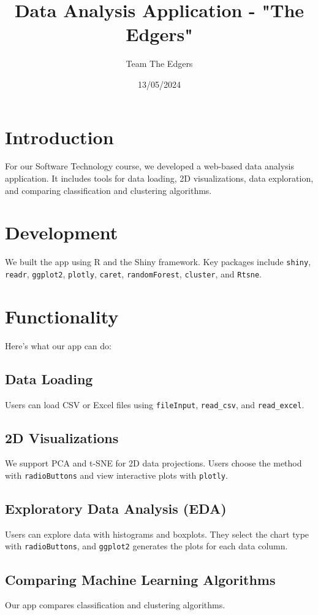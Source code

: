 \documentclass{article}
\title{Data Analysis Application - "The Edgers"}
\author{Team The Edgers}
\date{13/05/2024}
\begin{document}
\maketitle

\section{Introduction}
For our Software Technology course, we developed a web-based data analysis application. It includes tools for data loading, 2D visualizations, data exploration, and comparing classification and clustering algorithms.

\section{Development}
We built the app using R and the Shiny framework. Key packages include \texttt{shiny}, \texttt{readr}, \texttt{ggplot2}, \texttt{plotly}, \texttt{caret}, \texttt{randomForest}, \texttt{cluster}, and \texttt{Rtsne}.

\section{Functionality}
Here's what our app can do:

\subsection{Data Loading}
Users can load CSV or Excel files using \texttt{fileInput}, \texttt{read\_csv}, and \texttt{read\_excel}.

\subsection{2D Visualizations}
We support PCA and t-SNE for 2D data projections. Users choose the method with \texttt{radioButtons} and view interactive plots with \texttt{plotly}.

\subsection{Exploratory Data Analysis (EDA)}
Users can explore data with histograms and boxplots. They select the chart type with \texttt{radioButtons}, and \texttt{ggplot2} generates the plots for each data column.

\subsection{Comparing Machine Learning Algorithms}
Our app compares classification and clustering algorithms.
\end{document}
